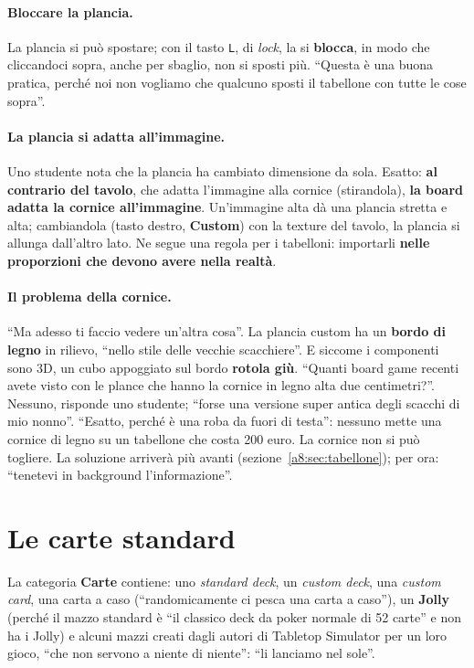 \paragraph{Bloccare la plancia.} La plancia si può spostare; con il tasto \texttt{L},
di \emph{lock}, la si \textbf{blocca}, in modo che cliccandoci sopra, anche per
sbaglio, non si sposti più. ``Questa è una buona pratica, perché noi non vogliamo che
qualcuno sposti il tabellone con tutte le cose sopra''.

\paragraph{La plancia si adatta all'immagine.} Uno studente nota che la plancia ha
cambiato dimensione da sola. Esatto: \textbf{al contrario del tavolo}, che adatta
l'immagine alla cornice (stirandola), \textbf{la board adatta la cornice
all'immagine}. Un'immagine alta dà una plancia stretta e alta; cambiandola (tasto
destro, \textbf{Custom}) con la texture del tavolo, la plancia si allunga dall'altro
lato. Ne segue una regola per i tabelloni: importarli \textbf{nelle proporzioni che
devono avere nella realtà}.

\paragraph{Il problema della cornice.} ``Ma adesso ti faccio vedere un'altra cosa''.
La plancia custom ha un \textbf{bordo di legno} in rilievo, ``nello stile delle vecchie
scacchiere''. E siccome i componenti sono 3D, un cubo appoggiato sul bordo
\textbf{rotola giù}. ``Quanti board game recenti avete visto con le plance che hanno la
cornice in legno alta due centimetri?''. Nessuno, risponde uno studente; ``forse una
versione super antica degli scacchi di mio nonno''. ``Esatto, perché è una roba da
fuori di testa'': nessuno mette una cornice di legno su un tabellone che costa 200
euro. La cornice non si può togliere. La soluzione arriverà più avanti
(sezione~\ref{a8:sec:tabellone}); per ora: ``tenetevi in background l'informazione''.

\section{Le carte standard}
\label{a8:sec:carte-std}

La categoria \textbf{Carte} contiene: uno \emph{standard deck}, un \emph{custom deck},
una \emph{custom card}, una carta a caso (``randomicamente ci pesca una carta a
caso''), un \textbf{Jolly} (perché il mazzo standard è ``il classico deck da poker
normale di 52 carte'' e non ha i Jolly) e alcuni mazzi creati dagli autori di Tabletop
Simulator per un loro gioco, ``che non servono a niente di niente'': ``li lanciamo nel
sole''.

